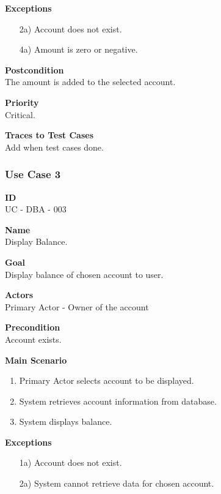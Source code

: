 \documentclass[12pt]{article}
\begin{document}
\noindent
    {\bf Exceptions}\\
    \vspace{-0.2in}
    \begin{itemize}
    \item[2a)] Account does not exist.
    \item[4a)] Amount is zero or negative.
    \end{itemize}

\noindent
{\bf Postcondition}\\
The amount is added to the selected account.

\noindent
{\bf Priority}\\
Critical.

\noindent
{\bf Traces to Test Cases}\\
Add when test cases done.

\subsubsection{Use Case 3} \label{uc:3}

\noindent
{\bf ID}\\
UC - DBA - 003    

\noindent
{\bf Name}\\
Display Balance.

\noindent
{\bf Goal}\\
Display balance of chosen account to user.

\noindent
{\bf Actors}\\
Primary Actor - Owner of the account

\noindent
{\bf Precondition}\\
Account exists.

\noindent
{\bf Main Scenario}\\
\vspace*{-0.2in}
\begin{enumerate}
\item Primary Actor selects account to be displayed.
  \item System retrieves account information from database.
\item System displays balance.
\end{enumerate}

\noindent
{\bf Exceptions}\\
\vspace*{-0.2in}
\begin{itemize}
\item[1a)] Account does not exist.
\item[2a)] System cannot retrieve data for chosen account.
\end{itemize}
\end{document}
